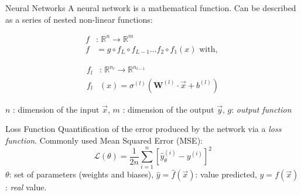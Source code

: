 \begin{frame}{Neural Networks}
    A neural network is a mathematical function. Can be described as a series of nested non-linear functions:

\begin{align}
f &\text{: } \mathbb{R}^n \to \mathbb{R}^m\nonumber\\
f &= g \circ f_L \circ f_{L-1} \dots f_2 \circ f_1 (x) \text{ with, }
\end{align}

\begin{align}
f_l &\text{: } \mathbb{R}^{n_l} \to \mathbb{R}^{n_{l-1}}\nonumber\\
f_l&(x) = \sigma^{(l)}(\mathbf{W}^{(l)} \cdot \Vec{x} + b^{(l)})
\end{align}

$n$ : dimension of the input $\Vec{x}$, $m$ : dimension of the output $\Vec{y}$, $g$: \emph{output function}
\end{frame}


\begin{frame}{Loss Function}
    Quantification of the error produced by the network via a \emph{loss function}. Commonly used Mean Squared Error (MSE):
    \begin{equation*}
        \label{eq:def-loss-function}
        \mathcal{L}(\theta) = \frac{1}{2n} \sum_{i=1}^n \left[\hat{y}_{\theta}^{(i)} - y^{(i)}\right]^2
    \end{equation*}
    $\theta$: set of parameters (weights and biases), $\hat{y} = \hat{f}(\Vec{x})$: value predicted, $y=f(\Vec{x})$: \emph{real} value.
\end{frame}


